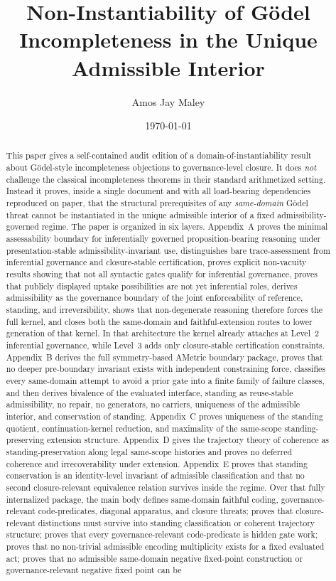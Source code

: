 \documentclass[11pt]{article}
\title{Non-Instantiability of G\"odel Incompleteness in the Unique Admissible Interior\\
}
\author{Amos Jay Maley}
\date{\today}
\theoremstyle{plain}
\theoremstyle{definition}
\begin{document}
\maketitle

\begin{abstract}
This paper gives a self-contained audit edition of a domain-of-instantiability result about G\"odel-style incompleteness objections to governance-level closure. It does \emph{not} challenge the classical incompleteness theorems in their standard arithmetized setting. Instead it proves, inside a single document and with all load-bearing dependencies reproduced on paper, that the structural prerequisites of any \emph{same-domain} G\"odel threat cannot be instantiated in the unique admissible interior of a fixed admissibility-governed regime. The paper is organized in six layers. Appendix~A proves the minimal assessability boundary for inferentially governed proposition-bearing reasoning under presentation-stable admissibility-invariant use, distinguishes bare trace-assessment from inferential governance and closure-stable certification, proves explicit non-vacuity results showing that not all syntactic gates qualify for inferential governance, proves that publicly displayed uptake possibilities are not yet inferential roles, derives admissibility as the governance boundary of the joint enforceability of reference, standing, and irreversibility, shows that non-degenerate reasoning therefore forces the full kernel, and closes both the same-domain and faithful-extension routes to lower generation of that kernel. In that architecture the kernel already attaches at Level~2 inferential governance, while Level~3 adds only closure-stable certification constraints. Appendix~B derives the full symmetry-based AMetric boundary package, proves that no deeper pre-boundary invariant exists with independent constraining force, classifies every same-domain attempt to avoid a prior gate into a finite family of failure classes, and then derives bivalence of the evaluated interface, standing as reuse-stable admissibility, no repair, no generators, no carriers, uniqueness of the admissible interior, and conservation of standing. Appendix~C proves uniqueness of the standing quotient, continuation-kernel reduction, and maximality of the same-scope standing-preserving extension structure. Appendix~D gives the trajectory theory of coherence as standing-preservation along legal same-scope histories and proves no deferred coherence and irrecoverability under extension. Appendix~E proves that standing conservation is an identity-level invariant of admissible classification and that no second closure-relevant equivalence relation survives inside the regime. Over that fully internalized package, the main body defines same-domain faithful coding, governance-relevant code-predicates, diagonal apparatus, and closure threats; proves that closure-relevant distinctions must survive into standing classification or coherent trajectory structure; proves that every governance-relevant code-predicate is hidden gate work; proves that no non-trivial admissible encoding multiplicity exists for a fixed evaluated act; proves that no admissible same-domain negative fixed-point construction or governance-relevant negative fixed point can be 
\end{abstract}
\end{document}
